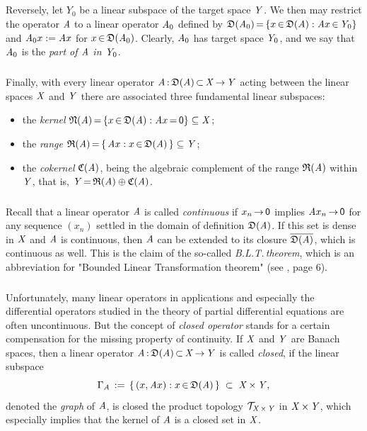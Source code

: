 \documentclass[11pt,twoside]{article}
\begin{document}
\subparagraph*{}
Reversely,
let $Y_0$ be a linear subspace of the target space $\mathit{Y}$.
We then may restrict the operator $\mathit{A}$ to a linear operator
$\mathit{A}_0$ defined by
$\mathfrak{D}(\mathit{A}_0) {\,=\,} \{x {\,\in\,} \mathfrak{D}(\mathit{A}): \mathit{A} x {\,\in\,} \mathit{Y}_0\}$
and $\mathit{A}_0 x := \mathit{A} x$ for $x {\,\in\,} \mathfrak{D}(\mathit{A}_0)$.
Clearly,
$\mathit{A}_0$ has target space $\mathit{Y}_0$,
and we say that $\mathit{A}_0$ is the \textit{part of $\mathit{A}$ in $\mathit{Y}_0$}.

\subparagraph*{}
Finally,
with every linear operator $\mathit{A} {\,:\,} \mathfrak{D}(\mathit{A}) {\,\subset\,} \mathit{X} {\,\to\,} \mathit{Y}$
acting between the linear spaces $\mathit{X}$ and $\mathit{Y}$
there are associated three fundamental linear subspaces:

\begin{itemize}[leftmargin=12pt]
\item[1.]
the \textit{kernel}
$\mathfrak{N}(\mathit{A}) {\,=\,} \{x {\,\in\,} \mathfrak{D}(\mathit{A}): \mathit{A} x {\,=\,} {\mathsf{0}}\}
\subseteq \mathit{X}$;

\item[2.]
the \textit{range} $\mathfrak{R}(\mathit{A}) {\,=\,}
\{\, \mathit{A} x: x {\,\in\,} \mathfrak{D}(\mathit{A})\,\} \subseteq \mathit{Y}$;

\item[3.]
the \textit{cokernel} $\mathfrak{C}{(\mathit{A})}$,
being the algebraic complement of the range $\mathfrak{R}(\mathit{A})$ within $\mathit{Y}$,
that is,
$\mathit{Y} {\,=\,} \mathfrak{R}(\mathit{A}) \oplus \mathfrak{C}{(\mathit{A})}$.
\end{itemize}

\subsubsection*{} %
Recall that a linear operator $\mathit{A}$ is called \textit{continuous}
if $x_n {\,\to\,} {\mathsf{0}}$ implies $\mathit{A} x_n {\,\to\,} {\mathsf{0}}$
for any sequence $(x_n)$ settled in the domain of definition $\mathfrak{D}(\mathit{A})$.
If this set is dense in $\mathit{X}$ and $\mathit{A}$ is continuous,
then $\mathit{A}$ can be extended to its closure $\overline{\mathfrak{D}(\mathit{A})}$,
which is continuous as well.
This is the claim of the so-called \textit{B.L.T.\,theorem},
which is an abbreviation for "Bounded Linear Transformation theorem"
(see \cite{RS1}, page 6).

\subsubsection*{} %
Unfortunately,
many linear operators in applications and especially the differential operators
studied in the theory of partial differential equations 
are often uncontinuous.
But the concept of \textit{closed operator} stands for
a certain compensation for the missing property of continuity.
If $\mathit{X}$ and $\mathit{Y}$ are Banach spaces,
then a linear operator $\mathit{A} {\,:\,} \mathfrak{D}(\mathit{A}) {\,\subset\,} \mathit{X} {\,\to\,} \mathit{Y}$
is called \textit{closed},
if the linear subspace
\[
\Gamma_{\mathit{A}} \,:=\,
\{\,(x,\mathit{A} x): x {\,\in\,} \mathfrak{D}(\mathit{A})\,\} \; \subset \; \mathit{X} {\,\times\,} \mathit{Y},
\]
denoted the \textit{graph} of $\mathit{A}$,
is closed {\wrt} the product topology $\mathcal{T}_{\mathit{X} {\,\times\,} \mathit{Y}}$
in $\mathit{X} {\,\times\,} \mathit{Y}$,
which especially implies that the kernel of $\mathit{A}$ is a closed set in $\mathit{X}$.
\end{document}
